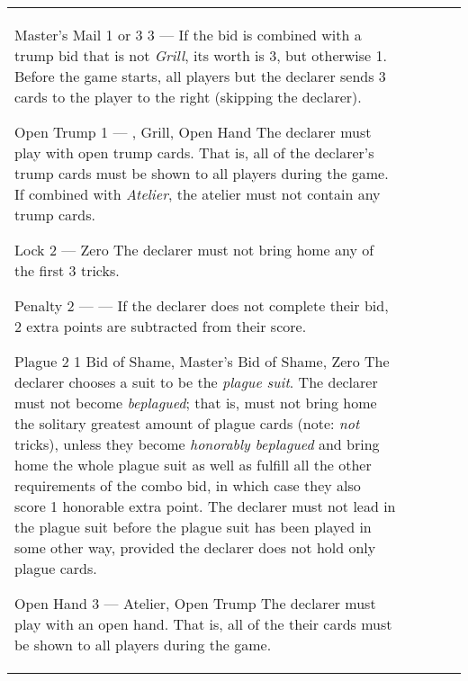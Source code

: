 \begin{center}
\begin{tabularx}{\textwidth}{
			l
			S[table-number-alignment=center, table-format=1.0]
			S[table-number-alignment=center, table-format=1.0]
			p{3cm}
			|X
		}
			\specialBidItem%
			{Master's Mail}
			{{1 or 3}}
			{3}
			{---}
			{%
				If the bid is combined with a trump bid that is not \emph{Grill}, its worth is 3, but otherwise 1. Before the game starts, all players but the declarer sends 3 cards to the player to the right (skipping the declarer).
			}

			\specialBidItem%
			{Open Trump}
			{1}
			{{---}}
			{\nonTrump, Grill, Open Hand}
			{%
				The declarer must play with open trump cards. That is, all of the declarer’s trump cards must be shown to all players during the game. If combined with \emph{Atelier}, the atelier must not contain any trump cards.
			}

			\specialBidItem%
			{Lock}
			{2}
			{{---}}
			{Zero}
			{%
				The declarer must not bring home any of the first 3 tricks.
			}

			\specialBidItem%
			{Penalty}
			{2}
			{{---}}
			{---}
			{%
				If the declarer does not complete their bid, 2 extra points are subtracted from their score.
			}

			\specialBidItem%
			{Plague}
			{2}
			{1}
			{Bid of Shame, Master's Bid of Shame, Zero}
			{%
				The declarer chooses a suit to be the \emph{plague suit}. The declarer must not become \emph{beplagued}; that is, must not bring home the solitary greatest amount of plague cards (note: \emph{not} tricks), unless they become \emph{honorably beplagued} and bring home the whole plague suit as well as fulfill all the other requirements of the combo bid, in which case they also score 1 honorable extra point. The declarer must not lead in the plague suit before the plague suit has been played in some other way, provided the declarer does not hold only plague cards.
			}

			\specialBidItem%
			{Open Hand}
			{3}
			{{---}}
			{Atelier, Open Trump}
			{%
				The declarer must play with an open hand. That is, all of the their cards must be shown to all players during the game.
			}
		\end{tabularx}
	\end{center}
